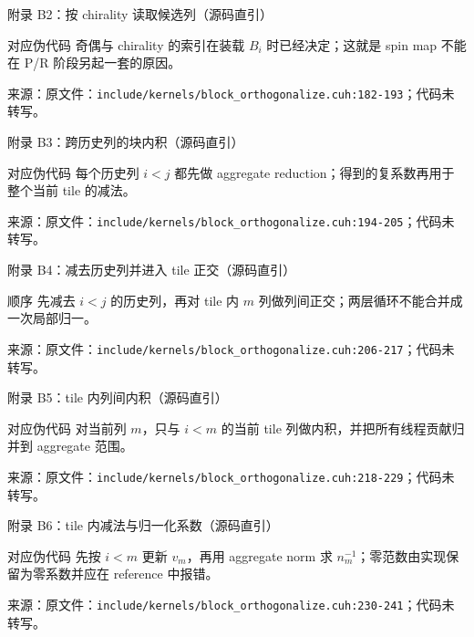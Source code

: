 \documentclass[UTF8,aspectratio=169,11pt]{ctexbeamer}
\newcommand{\source}[1]{\vspace{0.05em}\par{\raggedright\scriptsize\color{muted}来源：#1\par}}
\newcommand{\codepath}[1]{\nolinkurl{#1}}
\begin{document}
\begin{frame}[fragile,t]{附录 B2：按 chirality 读取候选列（源码直引）}
  
  \begin{block}{对应伪代码}
    奇偶与 chirality 的索引在装载 \(B_i\) 时已经决定；这就是 spin map 不能在 P/R 阶段另起一套的原因。
  \end{block}
  \source{原文件：\codepath{include/kernels/block_orthogonalize.cuh:182-193}；代码未转写。}
\end{frame}

\begin{frame}[fragile,t]{附录 B3：跨历史列的块内积（源码直引）}
  
  \begin{block}{对应伪代码}
    每个历史列 \(i<j\) 都先做 aggregate reduction；得到的复系数再用于整个当前 tile 的减法。
  \end{block}
  \source{原文件：\codepath{include/kernels/block_orthogonalize.cuh:194-205}；代码未转写。}
\end{frame}

\begin{frame}[fragile,t]{附录 B4：减去历史列并进入 tile 正交（源码直引）}
  
  \begin{alertblock}{顺序}
    先减去 \(i<j\) 的历史列，再对 tile 内 \(m\) 列做列间正交；两层循环不能合并成一次局部归一。
  \end{alertblock}
  \source{原文件：\codepath{include/kernels/block_orthogonalize.cuh:206-217}；代码未转写。}
\end{frame}

\begin{frame}[fragile,t]{附录 B5：tile 内列间内积（源码直引）}
  
  \begin{block}{对应伪代码}
    对当前列 \(m\)，只与 \(i<m\) 的当前 tile 列做内积，并把所有线程贡献归并到 aggregate 范围。
  \end{block}
  \source{原文件：\codepath{include/kernels/block_orthogonalize.cuh:218-229}；代码未转写。}
\end{frame}

\begin{frame}[fragile,t]{附录 B6：tile 内减法与归一化系数（源码直引）}
  
  \begin{block}{对应伪代码}
    先按 \(i<m\) 更新 \(v_m\)，再用 aggregate norm 求 \(n_m^{-1}\)；零范数由实现保留为零系数并应在 reference 中报错。
  \end{block}
  \source{原文件：\codepath{include/kernels/block_orthogonalize.cuh:230-241}；代码未转写。}
\end{frame}
\end{document}
